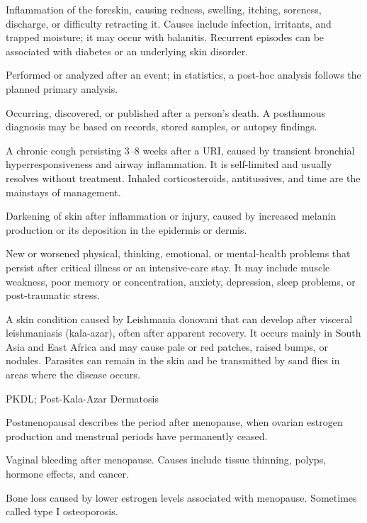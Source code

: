  Inflammation of the foreskin, causing redness, swelling, itching,
soreness, discharge, or difficulty retracting it. Causes include infection, irritants, and
trapped moisture; it may occur with balanitis. Recurrent episodes can be associated with
diabetes or an underlying skin disorder.

 Performed or analyzed after an event; in statistics, a post-hoc analysis follows the planned primary analysis.

 Occurring, discovered, or published after a person's death. A posthumous diagnosis may be based on records, stored samples, or autopsy findings.

 A chronic cough persisting 3--8 weeks after a URI, caused by transient bronchial
hyperresponsiveness and airway inflammation. It is self-limited and usually resolves
without treatment. Inhaled corticosteroids, antitussives, and time are the mainstays of
management.

 Darkening of skin after inflammation or injury, caused by increased melanin production or its deposition in the epidermis or dermis.

 New or worsened physical, thinking, emotional, or mental-health problems that persist after critical illness or an intensive-care stay. It may include muscle weakness, poor memory or concentration, anxiety, depression, sleep problems, or post-traumatic stress.

 A skin condition caused by Leishmania donovani that can develop after visceral leishmaniasis (kala-azar), often after apparent recovery. It occurs mainly in South Asia and East Africa and may cause pale or red patches, raised bumps, or nodules. Parasites can remain in the skin and be transmitted by sand flies in areas where the disease occurs.

\synonyms
PKDL; Post-Kala-Azar Dermatosis

 Postmenopausal describes the period after menopause, when ovarian estrogen production and menstrual periods have permanently ceased.

 Vaginal bleeding after menopause. Causes include tissue thinning, polyps, hormone effects, and cancer.

 Bone loss caused by lower estrogen levels associated with menopause. Sometimes called type I osteoporosis.

